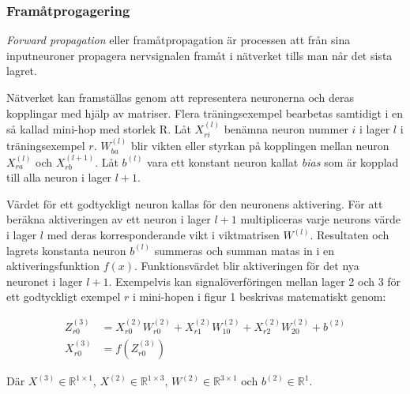 \documentclass[a4paper,11pt,twoside]{article}
\begin{document}
\subsubsection{Framåtprogagering}
\textit{Forward propagation} eller framåtpropagation är processen att från sina inputneuroner propagera nervsignalen framåt i nätverket tills man når det sista lagret. \cite{cs231n} \cite{wikiStanford}

Nätverket kan framställas genom att representera neuronerna och deras kopplingar med hjälp av matriser. Flera träningsexempel bearbetas samtidigt i en så kallad mini-hop med storlek R. Låt $X_{ri}^{(l)}$ benämna neuron nummer $i$ i lager $l$ i träningsexempel $r$. $W_{ba}^{(l)}$ blir vikten eller styrkan på kopplingen mellan neuron $X_{ra}^{(l)}$ och $X_{rb}^{(l+1)}$. Låt $b^{(l)}$ vara ett konstant neuron kallat \textit{bias} som är kopplad till alla neuron i lager $l+1$.  \cite{cs231n} \cite{wikiStanford}

Värdet för ett godtyckligt neuron kallas för den neuronens aktivering. För att beräkna aktiveringen av ett neuron i lager $l+1$ multipliceras varje neurons värde i lager $l$ med deras korresponderande vikt i viktmatrisen $W^{(l)}$. Resultaten och lagrets konstanta neuron $b^{(l)}$ summeras och summan matas in i en aktiveringsfunktion $f(x)$. Funktionsvärdet blir aktiveringen för det nya neuronet i lager $l+1$. Exempelvis kan signalöverföringen mellan lager 2 och 3 för ett godtyckligt exempel $r$ i mini-hopen i figur 1 beskrivas matematiskt genom: \cite{cs231n} \cite{wikiStanford}

\begin{align}
Z_{r0}^{(3)} & = X_{r0}^{(2)}W_{r0}^{(2)} + X_{r1}^{(2)}W_{10}^{(2)} + X_{r2}^{(2)}W_{20}^{(2)} + b^{(2)} \\
X_{r0}^{(3)} & = f(Z_{r0}^{(3)})
\end{align}

Där $X^{(3)} \in \mathbb{R}^{1 \times 1}$, $X^{(2)} \in \mathbb{R}^{1 \times 3}$, $W^{(2)} \in \mathbb{R}^{3 \times 1}$ och $b^{(2)} \in \mathbb{R}^{1}$.
\end{document}
